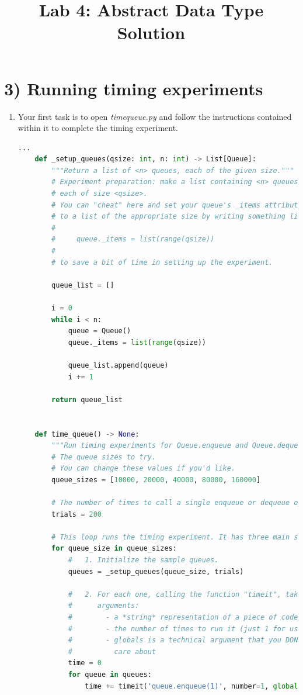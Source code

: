 \documentclass[12pt]{article}
\begin{document}
\title{Lab 4: Abstract Data Type Solution}
\date{}
\maketitle

\section*{3) Running timing experiments}
\begin{enumerate}[1.]
    \item Your first task is to open \textit{timequeue.py} and follow the instructions
    contained within it to complete the timing experiment.

    \begin{lstlisting}[language=Python,caption={task\_3\_q1\_solution.py},captionpos=b]
    ...
    def _setup_queues(qsize: int, n: int) -> List[Queue]:
        """Return a list of <n> queues, each of the given size."""
        # Experiment preparation: make a list containing <n> queues,
        # each of size <qsize>.
        # You can "cheat" here and set your queue's _items attribute directly
        # to a list of the appropriate size by writing something like
        #
        #     queue._items = list(range(qsize))
        #
        # to save a bit of time in setting up the experiment.

        queue_list = []

        i = 0
        while i < n:
            queue = Queue()
            queue._items = list(range(qsize))

            queue_list.append(queue)
            i += 1

        return queue_list


    def time_queue() -> None:
        """Run timing experiments for Queue.enqueue and Queue.dequeue."""
        # The queue sizes to try.
        # You can change these values if you'd like.
        queue_sizes = [10000, 20000, 40000, 80000, 160000]

        # The number of times to call a single enqueue or dequeue operation.
        trials = 200

        # This loop runs the timing experiment. It has three main steps:
        for queue_size in queue_sizes:
            #   1. Initialize the sample queues.
            queues = _setup_queues(queue_size, trials)

            #   2. For each one, calling the function "timeit", takes three
            #      arguments:
            #        - a *string* representation of a piece of code to run
            #        - the number of times to run it (just 1 for us)
            #        - globals is a technical argument that you DON'T need to
            #          care about
            time = 0
            for queue in queues:
                time += timeit('queue.enqueue(1)', number=1, globals=locals())


\end{lstlisting}
\end{enumerate}
\end{document}
